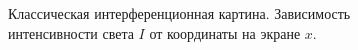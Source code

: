 \begin{figure}
\centering



\caption{Классическая интерференционная картина. Зависимость
  интенсивности света $I$ от координаты на экране $x$.}
\label{figPart4Ch2_3}
\end{figure}
